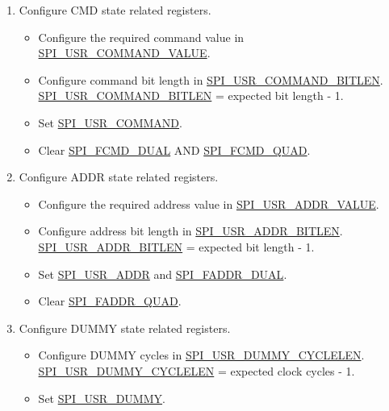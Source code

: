 \documentclass[main\_\_EN.tex]{subfiles}
\begin{document}
\begin{enumerate}
    \item Configure CMD state related registers.
        \begin{itemize}
            \item Configure the required command value in \hyperref[fielddesc:SPIUSRCOMMANDVALUE]{SPI\_USR\_COMMAND\_VALUE}.
            \item Configure command bit length in \hyperref[fielddesc:SPIUSRCOMMANDBITLEN]{SPI\_USR\_COMMAND\_BITLEN}. \hyperref[fielddesc:SPIUSRCOMMANDBITLEN]{SPI\_USR\_COMMAND\_BITLEN} = expected bit length - 1.
            \item Set \hyperref[fielddesc:SPIUSRCOMMAND]{SPI\_USR\_COMMAND}.
            \item Clear \hyperref[fielddesc:SPIFCMDDUAL]{SPI\_FCMD\_DUAL} AND \hyperref[fielddesc:SPIFCMDQUAD]{SPI\_FCMD\_QUAD}.
        \end{itemize}

    \item Configure ADDR state related registers.
        \begin{itemize}
            \item Configure the required address value in \hyperref[fielddesc:SPIUSRADDRVALUE]{SPI\_USR\_ADDR\_VALUE}.
            \item Configure address bit length in \hyperref[fielddesc:SPIUSRADDRBITLEN]{SPI\_USR\_ADDR\_BITLEN}. \hyperref[fielddesc:SPIUSRADDRBITLEN]{SPI\_USR\_ADDR\_BITLEN} = expected bit length - 1.
            \item Set \hyperref[fielddesc:SPIUSRADDR]{SPI\_USR\_ADDR} and \hyperref[fielddesc:SPIFADDRDUAL]{SPI\_FADDR\_DUAL}.
            \item Clear \hyperref[fielddesc:SPIFADDRQUAD]{SPI\_FADDR\_QUAD}.
        \end{itemize}

    \item Configure DUMMY state related registers.
        \begin{itemize}
            \item Configure DUMMY cycles in \hyperref[fielddesc:SPIUSRDUMMYCYCLELEN]{SPI\_USR\_DUMMY\_CYCLELEN}. \hyperref[fielddesc:SPIUSRDUMMYCYCLELEN]{SPI\_USR\_DUMMY\_CYCLELEN} = expected clock cycles - 1.
            \item Set \hyperref[fielddesc:SPIUSRDUMMY]{SPI\_USR\_DUMMY}.
        \end{itemize}


\end{enumerate}
\end{document}
